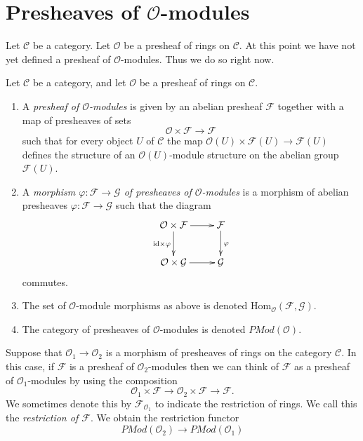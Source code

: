 \section{Presheaves of $\mathcal{O}$-modules}
\label{section-presheaves-modules}

\noindent
Let $\mathcal{C}$ be a category.
Let $\mathcal{O}$ be a presheaf of rings on $\mathcal{C}$.
At this point we have not yet defined a presheaf of $\mathcal{O}$-modules.
Thus we do so right now.

\begin{definition}
\label{definition-presheaf-modules}
Let $\mathcal{C}$ be a category, and
let $\mathcal{O}$ be a presheaf of rings on $\mathcal{C}$.
\begin{enumerate}
\item A {\it presheaf of $\mathcal{O}$-modules}
is given by an abelian presheaf $\mathcal{F}$ together with a
map of presheaves of sets
$$
\mathcal{O} \times \mathcal{F} \longrightarrow \mathcal{F}
$$
such that for every object $U$ of $\mathcal{C}$ the map
$\mathcal{O}(U) \times \mathcal{F}(U) \to \mathcal{F}(U)$
defines the structure of an $\mathcal{O}(U)$-module
structure on the abelian group $\mathcal{F}(U)$.
\item A {\it morphism $\varphi : \mathcal{F} \to \mathcal{G}$
of presheaves of $\mathcal{O}$-modules} is a morphism of abelian presheaves
$\varphi : \mathcal{F} \to \mathcal{G}$ such that
the diagram
$$
\xymatrix{
\mathcal{O} \times \mathcal{F} \ar[r] \ar[d]_{\text{id}\times \varphi} &
\mathcal{F} \ar[d]^{\varphi} \\
\mathcal{O} \times \mathcal{G} \ar[r] &
\mathcal{G}
}
$$
commutes.
\item The set of $\mathcal{O}$-module morphisms as above is
denoted $\text{Hom}_{\mathcal{O}}(\mathcal{F}, \mathcal{G})$.
\item The category of presheaves of $\mathcal{O}$-modules is denoted
$\textit{PMod}(\mathcal{O})$.
\end{enumerate}
\end{definition}

\noindent
Suppose that $\mathcal{O}_1 \to \mathcal{O}_2$ is a
morphism of presheaves of rings on the category $\mathcal{C}$. In this case,
if $\mathcal{F}$ is a presheaf of $\mathcal{O}_2$-modules
then we can think of $\mathcal{F}$ as a presheaf of
$\mathcal{O}_1$-modules by using the composition
$$
\mathcal{O}_1 \times \mathcal{F}
\to
\mathcal{O}_2 \times \mathcal{F}
\to
\mathcal{F}.
$$
We sometimes denote this by $\mathcal{F}_{\mathcal{O}_1}$
to indicate the restriction of rings. We call this
the {\it restriction of $\mathcal{F}$}. We obtain the
restriction functor
$$
\textit{PMod}(\mathcal{O}_2)
\longrightarrow
\textit{PMod}(\mathcal{O}_1)
$$

